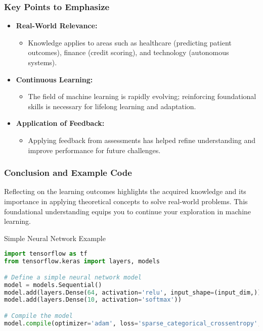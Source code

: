 \documentclass[aspectratio=169]{beamer}
\begin{document}
\begin{frame}
    \frametitle{Key Points to Emphasize}
    \begin{itemize}
        \item \textbf{Real-World Relevance:} 
            \begin{itemize}
                \item Knowledge applies to areas such as healthcare (predicting patient outcomes), finance (credit scoring), and technology (autonomous systems).
            \end{itemize}
        
        \item \textbf{Continuous Learning:} 
            \begin{itemize}
                \item The field of machine learning is rapidly evolving; reinforcing foundational skills is necessary for lifelong learning and adaptation.
            \end{itemize}
        
        \item \textbf{Application of Feedback:}
            \begin{itemize}
                \item Applying feedback from assessments has helped refine understanding and improve performance for future challenges.
            \end{itemize}
    \end{itemize}
\end{frame}

\begin{frame}[fragile]
    \frametitle{Conclusion and Example Code}
    Reflecting on the learning outcomes highlights the acquired knowledge and its importance in applying theoretical concepts to solve real-world problems. This foundational understanding equips you to continue your exploration in machine learning.

    \begin{block}{Simple Neural Network Example}
    \begin{lstlisting}[language=Python]
import tensorflow as tf
from tensorflow.keras import layers, models

# Define a simple neural network model
model = models.Sequential()
model.add(layers.Dense(64, activation='relu', input_shape=(input_dim,)))
model.add(layers.Dense(10, activation='softmax'))

# Compile the model
model.compile(optimizer='adam', loss='sparse_categorical_crossentropy', metrics=['accuracy'])
    \end{lstlisting}
    \end{block}
\end{frame}
\end{document}
